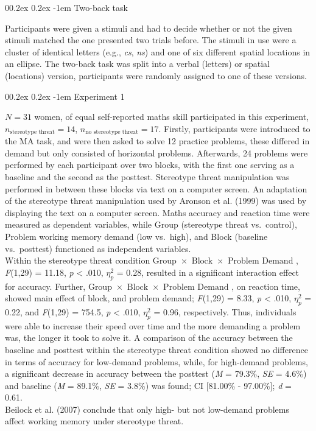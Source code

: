 \documentclass[
  stu]{apa7}
\makeatletter
\let\oldparagraph\paragraph
\renewcommand{\paragraph}[1]{\oldparagraph{#1}\mbox{}}
\renewcommand{\paragraph}{\@startsection{paragraph}{4}{\parindent}%
  {0\baselineskip \@plus 0.2ex \@minus 0.2ex}%
  {-1em}%
  {\normalfont\normalsize\bfseries\itshape\typesectitle}}
\renewcommand{\paragraph}{\@startsection{paragraph}{4}{\parindent}%
  {0\baselineskip \@plus 0.2ex \@minus 0.2ex}%
  {-1em}%
  {\normalfont\normalsize\bfseries\typesectitle}}
\makeatother
\begin{document}
\paragraph{Two-back task}\label{two-back-task}

Participants were given a stimuli and had to decide whether or not the given stimuli matched the one presented two trials before.
The stimuli in use were a cluster of identical letters (e.g., \emph{cs}, \emph{ns}) and one of six different spatial locations in an ellipse.
The two-back task was split into a verbal (letters) or spatial (locations) version, participants were randomly assigned to one of these versions.

\paragraph{Experiment 1}\label{experiment-1}

\(N = 31\) women, of equal self-reported maths skill participated in this experiment, \(n_{\text{stereotype threat}} = 14\), \(n_{\text{no stereotype threat}} = 17\).
Firstly, participants were introduced to the MA task, and were then asked to solve 12 practice problems, these differed in demand but only consisted of horizontal problems.
Afterwards, 24 problems were performed by each participant over two blocks, with the first one serving as a baseline and the second as the posttest.
Stereotype threat manipulation was performed in between these blocks via text on a computer screen.
An adaptation of the stereotype threat manipulation used by Aronson et al. (1999) was used by displaying the text on a computer screen.
Maths accuracy and reaction time were measured as dependent variables, while Group (stereotype threat vs.~control), Problem working memory demand (low vs.~high), and Block (baseline vs.~posttest) functioned as independent variables.\\
Within the stereotype threat condition \(\text{Group } \times \text{ Block } \times \text{ Problem Demand }\), \emph{F}(1,29) = 11.18, \emph{p} \textless{} .010, \(\eta^{2}_{p}\) = 0.28, resulted in a significant interaction effect for accuracy.
Further, \(\text{Group } \times \text{ Block } \times \text{ Problem Demand }\), on reaction time, showed main effect of block, and problem demand; \emph{F}(1,29) = 8.33, \emph{p} \textless{} .010, \(\eta^{2}_{p}\) = 0.22, and \emph{F}(1,29) = 754.5, \emph{p} \textless{} .010, \(\eta^{2}_{p}\) = 0.96, respectively.
Thus, individuals were able to increase their speed over time and the more demanding a problem was, the longer it took to solve it.
A comparison of the accuracy between the baseline and posttest within the stereotype threat condition showed no difference in terms of accuracy for low-demand problems, while, for high-demand problems, a significant decrease in accuracy between the posttest (\emph{M} = 79.3\%, \emph{SE} = 4.6\%) and baseline (\emph{M} = 89.1\%, \emph{SE} = 3.8\%) was found; CI {[}81.00\% - 97.00\%{]}; \emph{d} = 0.61.\\
Beilock et al. (2007) conclude that only high- but not low-demand problems affect working memory under stereotype threat.
\end{document}
